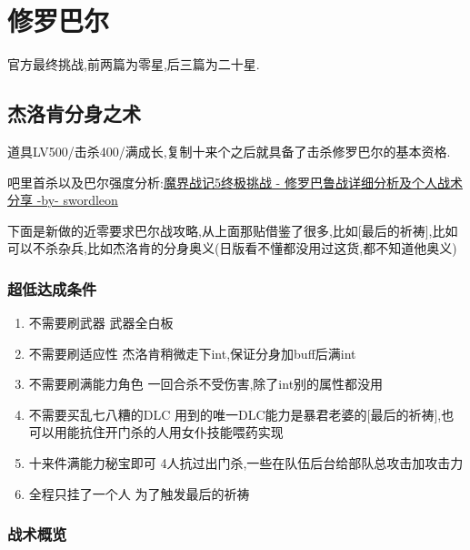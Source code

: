 \newpage

\section{修罗巴尔}

官方最终挑战,前两篇为零星,后三篇为二十星.

{\color{red}{如果准备了大概200个万灵药做的咖喱可以不需要装备就达到20亿血,简化辅助人员的需求}}

	\newpage

	\subsection{杰洛肯分身之术}

	道具LV500/击杀400/满成长,复制十来个之后就具备了击杀修罗巴尔的基本资格.

	{\color{red}{如果准备了大概200个万灵药做的咖喱可以不需要装备就达到20亿血,简化辅助人员的需求}}

	吧里首杀以及巴尔强度分析:\href{http://tieba.baidu.com/p/3949061316}{魔界战记5终极挑战 - 修罗巴鲁战详细分析及个人战术分享 -by- swordleon }

	下面是新做的近零要求巴尔战攻略,从上面那贴借鉴了很多,比如[最后的祈祷],比如可以不杀杂兵,比如杰洛肯的分身奥义(日版看不懂都没用过这货,都不知道他奥义)

	\subsubsection{超低达成条件}
	\begin{enumerate}
		\item{不需要刷武器}
		武器全白板

		\item{不需要刷适应性}
		杰洛肯稍微走下int,保证分身加buff后满int

		\item{不需要刷满能力角色}
		一回合杀不受伤害,除了int别的属性都没用

		\item{不需要买乱七八糟的DLC}
		用到的唯一DLC能力是暴君老婆的[最后的祈祷],也可以用能抗住开门杀的人用女仆技能喂药实现

		\item{十来件满能力秘宝即可}
		4人抗过出门杀,一些在队伍后台给部队总攻击加攻击力

		\item{全程只挂了一个人}
		为了触发最后的祈祷
	\end{enumerate}

	\subsubsection{战术概览}

